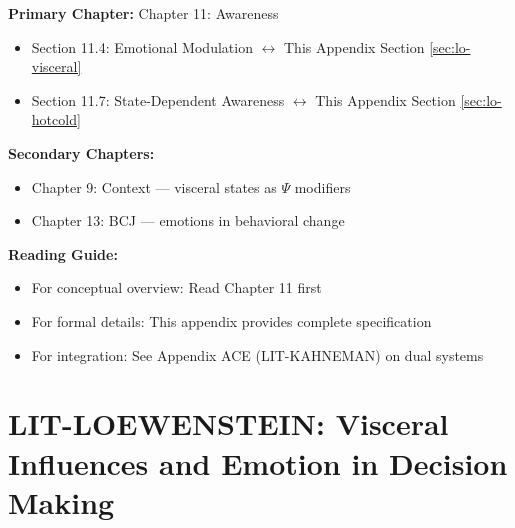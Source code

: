 \begin{tcolorbox}[colback=purple!5!white, colframe=purple!75!black,
    title=Chapter Linkage]

\textbf{Primary Chapter:} Chapter 11: Awareness
\begin{itemize}[nosep]
\item Section 11.4: Emotional Modulation $\leftrightarrow$ This Appendix Section \ref{sec:lo-visceral}
\item Section 11.7: State-Dependent Awareness $\leftrightarrow$ This Appendix Section \ref{sec:lo-hotcold}
\end{itemize}

\textbf{Secondary Chapters:}
\begin{itemize}[nosep]
\item Chapter 9: Context --- visceral states as $\Psi$ modifiers
\item Chapter 13: BCJ --- emotions in behavioral change
\end{itemize}

\textbf{Reading Guide:}
\begin{itemize}[nosep]
\item For conceptual overview: Read Chapter 11 first
\item For formal details: This appendix provides complete specification
\item For integration: See Appendix ACE (LIT-KAHNEMAN) on dual systems
\end{itemize}

\end{tcolorbox}


\chapter{LIT-LOEWENSTEIN: Visceral Influences and Emotion in Decision Making}
\label{app:lit-loewenstein}


\begin{abstract}
This appendix integrates George Loewenstein's research program into the EBF framework.
Loewenstein's work establishes that: (1) visceral states (hunger, pain, arousal, emotions)
systematically override cognitive preferences; (2) people in ``cold'' states cannot
accurately predict their behavior in ``hot'' states (hot-cold empathy gap); (3) curiosity
arises from information gaps; (4) anticipation generates utility independent of consumption.
His contributions fundamentally reshape how EBF models the Awareness function $A(\cdot)$
and Context $\Psi$. 29 papers spanning 1987-2016 are integrated, with 93\% providing
Tier-1 evidence.
\end{abstract}


